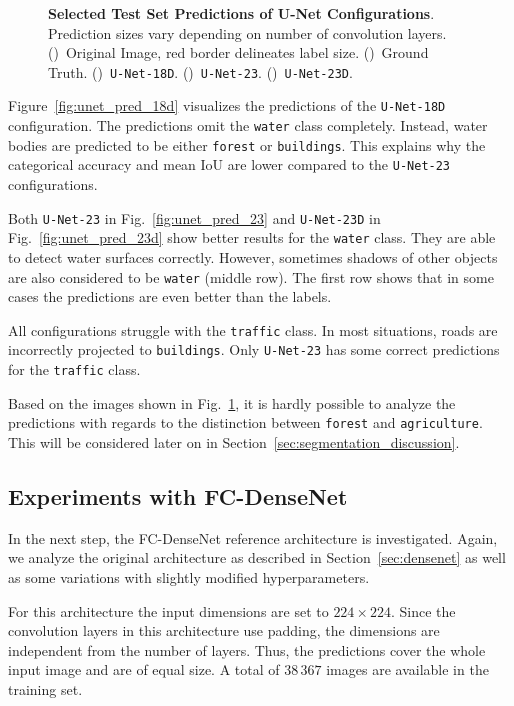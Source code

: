 \begin{figure}[h]
    \caption[Selected Test Set Predictions of U-Net Configurations]
    {\textbf{Selected Test Set Predictions of U-Net Configurations}. Prediction sizes vary depending on number of convolution layers.
    ()~Original Image, red border delineates label size.
    ()~Ground Truth.
    ()~\texttt{U-Net-18D}.
    ()~\texttt{U-Net-23}.
    ()~\texttt{U-Net-23D}.}
    \label{fig:unet_prediction_images}
\end{figure}

Figure~\ref{fig:unet_pred_18d} visualizes the predictions of the \texttt{U-Net-18D} configuration. The predictions omit the \texttt{water} class completely. Instead, water bodies are predicted to be either \texttt{forest} or \texttt{buildings}. This explains why the categorical accuracy and mean IoU are lower compared to the \texttt{U-Net-23} configurations.

Both \texttt{U-Net-23} in Fig.~\ref{fig:unet_pred_23} and \texttt{U-Net-23D} in Fig.~\ref{fig:unet_pred_23d} show better results for the \texttt{water} class. They are able to detect water surfaces correctly. However, sometimes shadows of other objects are also considered to be \texttt{water} (middle row). The first row shows that in some cases the predictions are even better than the labels.

All configurations struggle with the \texttt{traffic} class. In most situations, roads are incorrectly projected to \texttt{buildings}. Only \texttt{U-Net-23} has some correct predictions for the \texttt{traffic} class.

Based on the images shown in Fig.~\ref{fig:unet_prediction_images}, it is hardly possible to analyze the predictions with regards to the distinction between \texttt{forest} and \texttt{agriculture}. This will be considered later on in Section~\ref{sec:segmentation_discussion}.

\subsection{Experiments with FC-DenseNet}
\label{sec:densenet_experiments}
In the next step, the FC-DenseNet reference architecture is investigated. Again, we analyze the original architecture as described in Section~\ref{sec:densenet} as well as some variations with slightly modified hyperparameters.

For this architecture the input dimensions are set to $224\times 224$. Since the convolution layers in this architecture use padding, the dimensions are independent from the number of layers. Thus, the predictions cover the whole input image and are of equal size. A total of $38\,367$ images are available in the training set.

